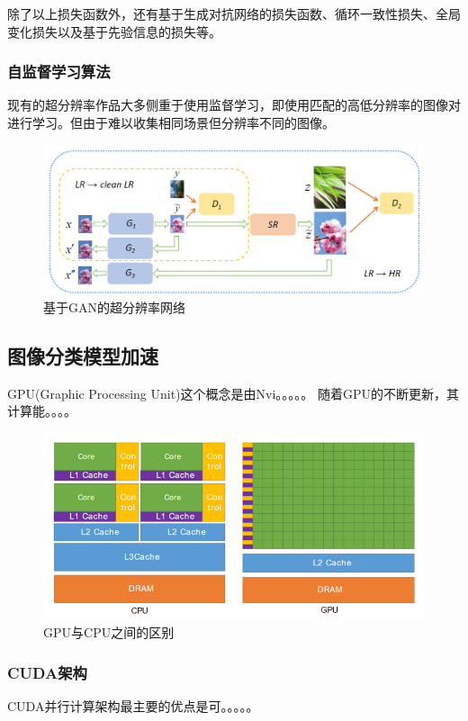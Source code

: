 \documentclass[UTF8,a4paper,11pt]{ctexart}
\begin{document}
\begin{sloppypar}
	除了以上损失函数外，还有基于生成对抗网络的损失函数、循环一致性损失、全局变化损失以及基于先验信息的损失等。
	
	\subsubsection{自监督学习算法}
	现有的超分辨率作品大多侧重于使用监督学习，即使用匹配的高低分辨率的图像对进行学习。但由于难以收集相同场景但分辨率不同的图像。
	
	\begin{figure}[htbp]
		\centering
		\includegraphics[width=13cm]{./image/GAN.png}
		\caption{基于GAN的超分辨率网络}
		\label{fig:label}
	\end{figure}
	
	
	\subsection{图像分类模型加速} %
	GPU(Graphic Processing Unit)这个概念是由Nvi。。。。。
	随着GPU的不断更新，其计算能。。。。
	
	\begin{figure}[htbp]
		\centering
		\includegraphics[width=14cm]{./image/gpu.png}
		\caption{GPU与CPU之间的区别}
		\label{fig:label}
	\end{figure}
	
	\subsubsection{CUDA架构}
	CUDA并行计算架构最主要的优点是可。。。。。
	

\end{sloppypar}
\end{document}
